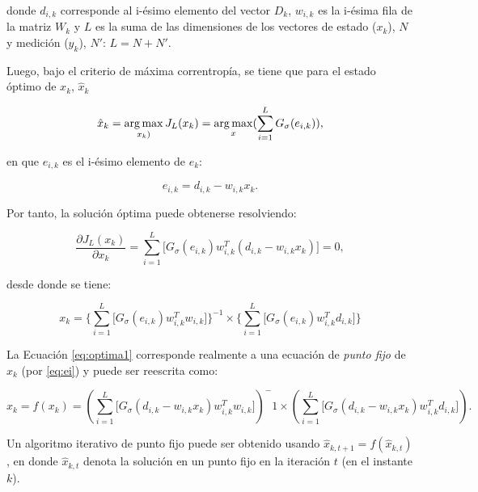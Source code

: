 donde $d_{i, k}$ corresponde al i-\'esimo elemento del vector $D_k$, $w_{i,k}$ es la i-\'esima fila de la matriz $W_k$ y $L$ es la suma de las dimensiones de los vectores de estado ($x_k$), $N$  y medici\'on ($y_k$), $N'$: $L=N+N'$.

Luego, bajo el criterio de m\'axima correntrop\'ia, se tiene que para el estado \'optimo de $x_k$, $\hat{x}_k$

\begin{equation}
\hat{x}_k = \operatorname*{arg\,max}_{x_k)} J_{L}(x_k)= \operatorname*{arg\,max}_x (\sum_{i=1}^L G_{\sigma} (e_{i,k})),
\label{eq:max}
\end{equation}
\bigskip

en que $e_{i,k}$ es el i-\'esimo elemento de $e_k$:

\begin{equation}
e_{i,k}= d_{i, k} - w_{i,k}x_k.
\label{eq:ei}
\end{equation}

Por tanto, la soluci\'on \'optima puede obtenerse resolviendo:

\begin{equation}
\dfrac{\partial J_L(x_k)}{\partial x_k} = \sum_{i=1}^L \lbrack G_{\sigma}(e_{i,k}) w_{i, k}^T (d_{i,k} -w_{i,k}x_k)  \rbrack =0, 
\label{eq:optimal}
\end{equation}
\bigskip

desde donde se tiene:

\begin{equation}
x_k = \lbrace \sum_{i=1}^L \lbrack G_{\sigma} (e_{i,k}) w_{i,k}^T w_{i,k} \rbrack \rbrace^{-1} \times
\lbrace \sum_{i=1}^L \lbrack G_{\sigma} (e_{i,k}) w_{i,k}^T d_{i,k} \rbrack \rbrace
\label{eq:optima1}
\end{equation}

La Ecuaci\'on \ref{eq:optima1} corresponde realmente a una ecuaci\'on de \textit{punto fijo} de $x_k$ (por \ref{eq:ei}) y puede ser reescrita como:

\begin{equation}
x_k = f(x_k) = \left( \sum_{i=1}^{L} \lbrack G_{\sigma} (d_{i,k} - w_{i,k}x_k) w_{i,k}^T w_{i,k}  \rbrack \right)^-1 \times \left( \sum_{i=1}^{L} \lbrack G_{\sigma} (d_{i,k} - w_{i,k}x_k) w_{i,k}^T d_{i,k}  \rbrack \right).
\label{eq:optimal2}
\end{equation}
\bigskip

Un algoritmo iterativo de punto fijo puede ser obtenido usando $\hat{x}_{k, t+1} = f(\hat{x}_{k, t})$, en donde $\hat{x}_{k, t}$ denota la soluci\'on en un punto fijo en la iteraci\'on $t$ (en el instante $k$).
\bigskip

